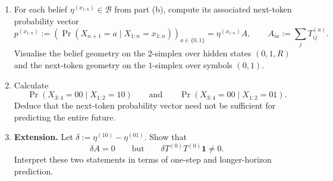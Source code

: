 \begin{exercise}
\begin{enumerate}
    \item For each belief $\eta^{(x_{1:n})}\in\mathcal B$ from part (b),
      compute its associated next-token probability vector
      \[
        p^{(x_{1:n})}
        :=\left(
          \Pr(X_{n+1}=a\mid X_{1:n}=x_{1:n})
        \right)_{a\in\{0,1\}}
        =\eta^{(x_{1:n})}A,
        \qquad
        A_{ia}:=\sum_jT^{(a)}_{ij}.
      \]
      Visualise the belief geometry on the $2$-simplex over hidden states
      $(0,1,R)$ and the next-token geometry on the $1$-simplex over symbols
      $(0,1)$.

    \item Calculate
      \[
        \Pr(X_{3:4}=00\mid X_{1:2}=10)
        \qquad\text{and}\qquad
        \Pr(X_{3:4}=00\mid X_{1:2}=01).
      \]
      Deduce that the next-token probability vector need not be sufficient for
      predicting the entire future.

    \item \textbf{Extension.} Let
      $\delta:=\eta^{(10)}-\eta^{(01)}$. Show that
      \[
        \delta A=0
        \qquad\text{but}\qquad
        \delta T^{(0)}T^{(0)}\mathbf 1\neq0.
      \]
      Interpret these two statements in terms of one-step and longer-horizon
      prediction.
  \end{enumerate}
\end{exercise}
